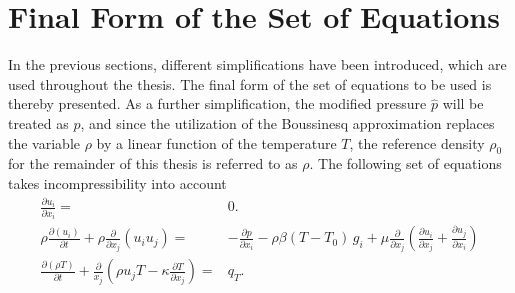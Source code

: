 \section{Final Form of the Set of Equations}

In the previous sections, different simplifications have been introduced, which are used throughout the thesis. The final form of the set of equations to be used is thereby presented. As a further simplification, the modified pressure \(\hat{p}\) will be treated as \(p\), and since the utilization of the Boussinesq approximation replaces the variable \(\rho\) by a linear function of the temperature \(T\), the reference density \(\rho_0\) for the remainder of this thesis is referred to as \(\rho\). The following set of equations takes incompressibility into account
\begin{subequations}
\label{eq:completeset}
\begin{align}
\label{eq:contidiff}
\frac{\partial u_i}{\partial x_i} =& 0. \\[1em]
\label{eq:momentumdiff}
\rho \frac{\partial \left( u_i \right)}{\partial t} 
+ \rho \frac{\partial}{\partial x_j} \left( u_i  u_j \right) 
=& - \frac{\partial p}{\partial x_i} 
- \rho \beta \left( T - T_0 \right)\, g_i
+  \mu \frac{\partial}{\partial x_j} \left( \frac{\partial u_i}{\partial x_j} 
+ \frac{\partial u_j}{\partial x_i} \right) \\[1em]
\label{eq:temperaturediff}
\frac{\partial \left(\rho T \right)}{\partial t} + \frac{\partial}{x_j} \left( \rho u_j T - \kappa \frac{\partial T}{\partial x_j} \right) =& q_T.
\end{align}
\end{subequations}

